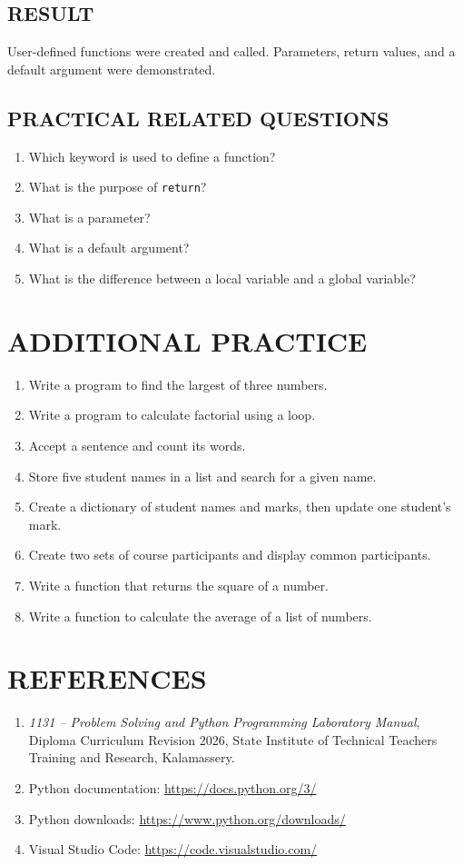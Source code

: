 \documentclass[12pt,a4paper]{report}
\newcommand{\result}[1]{\section*{RESULT}#1}
\newcommand{\questions}[1]{\section*{PRACTICAL RELATED QUESTIONS}#1}
\begin{document}
\result{User-defined functions were created and called. Parameters, return values, and a default argument were demonstrated.}

\questions{
\begin{enumerate}
\item Which keyword is used to define a function?
\item What is the purpose of \texttt{return}?
\item What is a parameter?
\item What is a default argument?
\item What is the difference between a local variable and a global variable?
\end{enumerate}}

\chapter*{ADDITIONAL PRACTICE}
\begin{enumerate}
\item Write a program to find the largest of three numbers.
\item Write a program to calculate factorial using a loop.
\item Accept a sentence and count its words.
\item Store five student names in a list and search for a given name.
\item Create a dictionary of student names and marks, then update one student's mark.
\item Create two sets of course participants and display common participants.
\item Write a function that returns the square of a number.
\item Write a function to calculate the average of a list of numbers.
\end{enumerate}

\chapter*{REFERENCES}
\begin{enumerate}
\item \textit{1131 -- Problem Solving and Python Programming Laboratory Manual}, Diploma Curriculum Revision 2026, State Institute of Technical Teachers Training and Research, Kalamassery.
\item Python documentation: \url{https://docs.python.org/3/}
\item Python downloads: \url{https://www.python.org/downloads/}
\item Visual Studio Code: \url{https://code.visualstudio.com/}
\end{enumerate}
\end{document}
